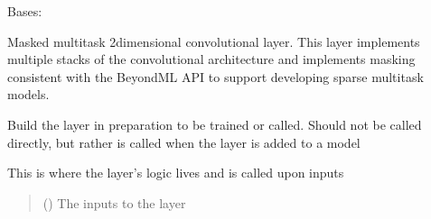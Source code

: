 \documentclass[letterpaper,10pt,english]{sphinxmanual}
\begin{document}
\begin{fulllineitems}
\label{\detokenize{beyondml.tflow.layers:beyondml.tflow.layers.MultiMaskedConv2D.MultiMaskedConv2D}}
\pysigstartsignatures
{}
\pysigstopsignatures
\sphinxAtStartPar
Bases: 

\sphinxAtStartPar
Masked multitask 2\sphinxhyphen{}dimensional convolutional layer. This layer implements
multiple stacks of the convolutional architecture and implements masking consistent
with the BeyondML API to support developing sparse multitask models.

\begin{fulllineitems}
\label{\detokenize{beyondml.tflow.layers:beyondml.tflow.layers.MultiMaskedConv2D.MultiMaskedConv2D.build}}
\pysigstartsignatures
{}
\pysigstopsignatures
\sphinxAtStartPar
Build the layer in preparation to be trained or called. Should not be called directly,
but rather is called when the layer is added to a model

\end{fulllineitems}


\begin{fulllineitems}
\label{\detokenize{beyondml.tflow.layers:beyondml.tflow.layers.MultiMaskedConv2D.MultiMaskedConv2D.call}}
\pysigstartsignatures
{}
\pysigstopsignatures
\sphinxAtStartPar
This is where the layer’s logic lives and is called upon inputs
\begin{quote}\begin{description}
\sphinxAtStartPar
{} () \textendash{} The inputs to the layer


\end{description}
\end{quote}
\end{fulllineitems}
\end{fulllineitems}
\end{document}
